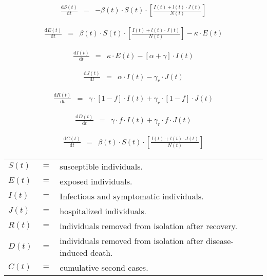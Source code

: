 \documentclass[11pt, onecolumn, fleqn]{article}
\begin{document}
\begin{eqnarray}
\frac{\mathrm{d} S(t)}{\mathrm{d} t} & = & - \beta (t) \cdot S(t) \cdot \left[ \frac{I(t) + l(t) \cdot J(t)}{N(t)} \right]
\end{eqnarray}

\begin{eqnarray}
\frac{\mathrm{d} E(t)}{\mathrm{d} t} & = & \beta (t) \cdot S(t) \cdot \left[ \frac{I(t) + l(t) \cdot J(t)}{N(t)} \right] - \kappa \cdot E(t)
\end{eqnarray}

\begin{eqnarray}
\frac{\mathrm{d} I(t)}{\mathrm{d} t} & = & \kappa \cdot E(t) - \left[ \alpha + \gamma \right] \cdot I(t)
\end{eqnarray}

\begin{eqnarray}
\frac{\mathrm{d} J(t)}{\mathrm{d} t} & = & \alpha \cdot I(t) - \gamma_{r} \cdot J(t)
\end{eqnarray}

\begin{eqnarray}
\frac{\mathrm{d} R(t)}{\mathrm{d} t} & = & \gamma \cdot \left[ 1 - f \right] \cdot I(t) + \gamma_{r} \cdot \left[ 1 - f \right] \cdot J(t)
\end{eqnarray}

\begin{eqnarray}
\frac{\mathrm{d} D(t)}{\mathrm{d} t} & = & \gamma \cdot f \cdot I(t) + \gamma_{r} \cdot f \cdot J(t)
\end{eqnarray}

\begin{eqnarray}
\frac{\mathrm{d} C(t)}{\mathrm{d} t} & = & \beta (t) \cdot S(t) \cdot \left[ \frac{I(t) + l(t) \cdot J(t)}{N(t)} \right]
\end{eqnarray}

\vspace{0.5cm}

\begin{tabular}{ l c l }
$S(t)$ & $=$ & susceptible individuals. \\
$E(t)$ & $=$ & exposed individuals. \\
$I(t)$ & $=$ & Infectious and symptomatic individuals. \\
$J(t)$ & $=$ & hospitalized individuals. \\
$R(t)$ & $=$ & individuals removed from isolation after recovery. \\
$D(t)$ & $=$ & individuals removed from isolation after disease-induced death. \\
$C(t)$ & $=$ & cumulative second cases. \\
\end{tabular}
\end{document}
